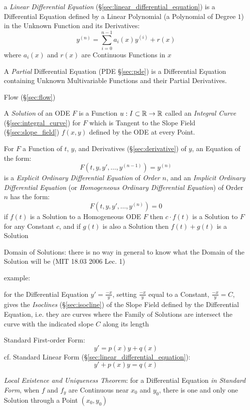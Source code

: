 \fist a \emph{Linear Differential Equation}
(\S\ref{sec:linear_differential_equation}) is a Differential Equation defined
by a Linear Polynomial (a Polynomial of Degree $1$) in the Unknown Function and
its Derivatives:
\[
  y^{(n)} = \sum_{i=0}^{n-1} a_i (x) y^{(i)} + r(x)
\]
where $a_i(x)$ and $r(x)$ are Continuous Functions in $x$

\fist A \emph{Partial} Differential Equation (PDE
\S\ref{sec:pde}) is a Differential Equation
containing Unknown Multivariable Functions and their Partial Derivatives.

\fist Flow (\S\ref{sec:flow})

A \emph{Solution} of an ODE $F$ is a Function $u : I \subset \mathbb{R} \rightarrow
\mathbb{R}$ called an \emph{Integral Curve} (\S\ref{sec:integral_curve}) for $F$
which is Tangent to the Slope Field (\S\ref{sec:slope_field}) $f(x,y)$ defined
by the ODE at every Point.

For $F$ a Function of $t$, $y$, and Derivatives (\S\ref{sec:derivative}) of
$y$, an Equation of the form:
\[
  F(t,y,y',\ldots,y^{(n-1)}) = y^{(n)}
\]
is a \emph{Explicit Ordinary Differential Equation} of \emph{Order $n$}, and an
\emph{Implicit Ordinary Differential Equation} (or \emph{Homogeneous Ordinary
  Differential Equation}) of Order $n$ has the form:
\[
  F(t,y,y',\ldots,y^{(n)}) = 0
\]
if $f(t)$ is a Solution to a Homogeneous ODE $F$ then $c\cdot{f(t)}$ is a
Solution to $F$ for any Constant $c$, and if $g(t)$ is also a Solution then
$f(t) + g(t)$ is a Solution


Domain of Solutions: there is no way in general to know what the Domain of the
Solution will be (MIT 18.03 2006 Lec. 1)

example:

for the Differential Equation $y' = \frac{-x}{y}$, setting $\frac{-x}{y}$ equal
to a Constant, $\frac{-x}{y} = C$, gives the \emph{Isoclines}
(\S\ref{sec:isocline}) of the Slope Field defined by the Differential Equation,
i.e. they are curves where the Family of Solutions are intersect the
curve with the indicated slope $C$ along its length

Standard First-order Form:
\[
  y' = p(x) y + q(x)
\]
cf. Standard Linear Form (\S\ref{sec:linear_differential_equation}):
\[
  y' + p(x) y = q(x)
\]

\emph{Local Existence and Uniqueness Theorem}: for a Differential Equation
\emph{in Standard Form}, when $f$ and $f_y$ are Continuous near $x_0$ and
$y_0$, there is one and only one Solution through a Point $(x_0, y_0)$

